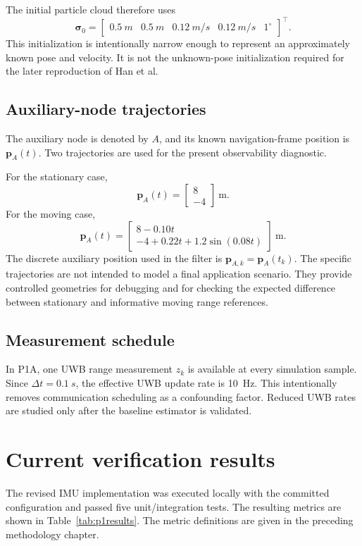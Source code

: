 The initial particle cloud therefore uses
\begin{equation}
\bm{\sigma}_0=
\begin{bmatrix}
\SI{0.5}{m} & \SI{0.5}{m} & \SI{0.12}{m/s} & \SI{0.12}{m/s} & 1^\circ
\end{bmatrix}^{\top}.
\end{equation}
This initialization is intentionally narrow enough to represent an approximately known pose and velocity. It is not the unknown-pose initialization required for the later reproduction of Han et al.

\subsection{Auxiliary-node trajectories}
The auxiliary node is denoted by $A$, and its known navigation-frame position is $\bm{p}_{A}(t)$. Two trajectories are used for the present observability diagnostic.

For the stationary case,
\begin{equation}
\bm{p}_{A}(t)=
\begin{bmatrix}
8\\-4
\end{bmatrix}\ \mathrm{m}.
\end{equation}
For the moving case,
\begin{equation}
\bm{p}_{A}(t)=
\begin{bmatrix}
8-0.10t\\
-4+0.22t+1.2\sin(0.08t)
\end{bmatrix}\ \mathrm{m}.
\end{equation}
The discrete auxiliary position used in the filter is $\bm{p}_{A,k}=\bm{p}_{A}(t_k)$. The specific trajectories are not intended to model a final application scenario. They provide controlled geometries for debugging and for checking the expected difference between stationary and informative moving range references.

\subsection{Measurement schedule}
In P1A, one UWB range measurement $z_k$ is available at every simulation sample. Since $\Delta t=\SI{0.1}{s}$, the effective UWB update rate is \SI{10}{Hz}. This intentionally removes communication scheduling as a confounding factor. Reduced UWB rates are studied only after the baseline estimator is validated.

\section{Current verification results}
The revised IMU implementation was executed locally with the committed configuration and passed five unit/integration tests. The resulting metrics are shown in Table~\ref{tab:p1results}. The metric definitions are given in the preceding methodology chapter.

